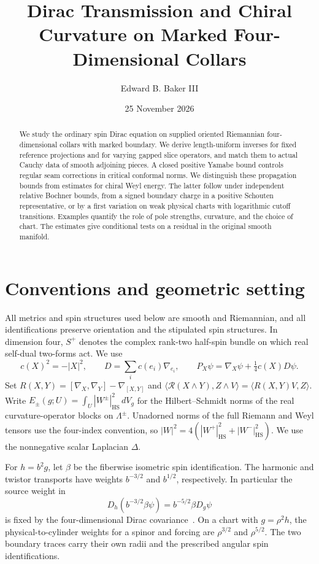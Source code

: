 \documentclass[11pt]{article}
\title{Dirac Transmission and Chiral Curvature on Marked Four-Dimensional Collars}
\author{Edward B. Baker III}
\date{25 November 2026}
\theoremstyle{remark}
\newcommand{\ip}[2]{\langle #1,#2\rangle}
\begin{document}
\maketitle

\begin{abstract}
We study the ordinary spin Dirac equation on supplied oriented Riemannian four-dimensional collars with marked boundary. We derive length-uniform inverses for fixed reference projections and for varying gapped slice operators, and match them to actual Cauchy data of smooth adjoining pieces. A closed positive Yamabe bound controls regular seam corrections in critical conformal norms. We distinguish these propagation bounds from estimates for chiral Weyl energy. The latter follow under independent relative Bochner bounds, from a signed boundary charge in a positive Schouten representative, or by a first variation on weak physical charts with logarithmic cutoff transitions. Examples quantify the role of pole strengths, curvature, and the choice of chart. The estimates give conditional tests on a residual in the original smooth manifold.
\end{abstract}

\section{Conventions and geometric setting}

All metrics and spin structures used below are smooth and Riemannian, and all identifications preserve orientation and the stipulated spin structures. In dimension four, \(S^+\) denotes the complex rank-two half-spin bundle on which real self-dual two-forms act. We use
\[
 c(X)^2=-|X|^2,\qquad D=\sum_i c(e_i)\nabla_{e_i},\qquad
 P_X\psi=\nabla_X\psi+\tfrac14 c(X)D\psi .
\]
Set \(R(X,Y)=[\nabla_X,\nabla_Y]-\nabla_{[X,Y]}\) and
\(\ip{\mathcal R(X\wedge Y)}{Z\wedge V}=\ip{R(X,Y)V}{Z}\).
Write \(E_\pm(g;U)=\int_U |W^\pm|_{\mathrm{HS}}^2\,dV_g\) for the Hilbert--Schmidt norms of the real curvature-operator blocks on \(\Lambda^\pm\). Unadorned norms of the full Riemann and Weyl tensors use the four-index convention, so \(|W|^2=4(|W^+|_{\mathrm{HS}}^2+|W^-|_{\mathrm{HS}}^2)\). We use the nonnegative scalar Laplacian \(\Delta\).

For \(h=b^2g\), let \(\beta\) be the fiberwise isometric spin identification. The harmonic and twistor transports have weights \(b^{-3/2}\) and \(b^{1/2}\), respectively. In particular the source weight in
\begin{equation}
 D_h(b^{-3/2}\beta\psi)=b^{-5/2}\beta D_g\psi
 \label{eq:conformal}
\end{equation}
is fixed by the four-dimensional Dirac covariance~\cite[\S1.4]{Hitchin1974Harmonic}. On a chart with \(g=\rho^2h\), the physical-to-cylinder weights for a spinor and forcing are \(\rho^{3/2}\) and \(\rho^{5/2}\). The two boundary traces carry their own radii and the prescribed angular spin identifications.
\end{document}
